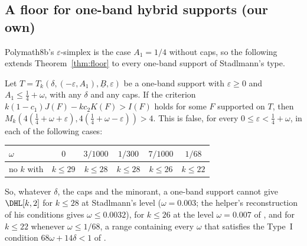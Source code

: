 \subsection*{A floor for one-band hybrid supports (our own)}
Polymath8b's $\varepsilon$-simplex is the case $A_1=1/4$ without caps, so the
following extends Theorem~\ref{thm:floor} to every one-band support of
Stadlmann's type.

\begin{theorem}\label{thm:hybrid-floor}
Let $T=T_k(\delta,(-\varepsilon,A_1),\underline B,\varepsilon)$ be a one-band
support with $\varepsilon\ge0$ and $A_1\le\frac14+\omega$, with any $\delta$
and any caps. If the criterion $k(1-c_1)J(F)-kc_2K(F)>I(F)$ holds for some
$F$ supported on $T$, then
$M_k\left(4(\tfrac14+\omega+\varepsilon),4(\tfrac14+\omega-\varepsilon)\right)>4$. This
is false, for every $0\le\varepsilon<\frac14+\omega$, in each of the
following cases:
\begin{center}
\begin{tabular}{@{}lccccc@{}}
\toprule
$\omega$ & $0$ & $3/1000$ & $1/300$ & $7/1000$ & $1/68$\\
\midrule
no $k$ with & $k\le29$ & $k\le28$ & $k\le28$ & $k\le26$ & $k\le22$\\
\bottomrule
\end{tabular}
\end{center}
So, whatever $\delta$, the caps and the minorant, a one-band support cannot give
$\DHL[k,2]$ for $k\le28$ at Stadlmann's level ($\omega=0.003$; the helper's
reconstruction of his conditions gives $\omega\le0.0032$), for $k\le26$ at the
level $\omega=0.007$ of \cite{Cha26}, and for $k\le22$ whenever
$\omega\le1/68$, a range containing every $\omega$ that satisfies the
Type~I condition $68\omega+14\delta<1$ of \cite[Lemma~5]{Sta26}.
\end{theorem}

